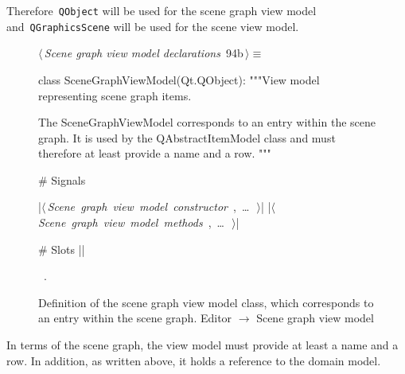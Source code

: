 \documentclass[%
    a4paper,    %
    justified,  %
    nobib,      %
    openany     %
]{tufte-book}
\makeatletter
\renewcommand{\label}[1]{\@tufte@label{##1}}%
\makeatother
\begin{document}
Therefore~\verb=QObject= will be used for the scene graph view model
and~\verb=QGraphicsScene= will be used for the scene view model.

\begin{figure}[!htbp]
\begin{flushleft} \small
\begin{minipage}{\linewidth}\label{scrap23}\raggedright\small
{} $\langle\,${\itshape Scene graph view model declarations}\nobreak\ {\footnotesize {94b}}$\,\rangle\equiv$
\vspace{-1ex}
\begin{pythoncode}
class SceneGraphViewModel(Qt.QObject):
    """View model representing scene graph items.

    The SceneGraphViewModel corresponds to an entry within the
    scene graph. It is used by the QAbstractItemModel class and
    must therefore at least provide a name and a row.
    """

    # Signals

    |\hbox{$\langle\,${\itshape Scene graph view model constructor}\nobreak\ {\footnotesize {}, \ldots\ }$\,\rangle$}|
    |\hbox{$\langle\,${\itshape Scene graph view model methods}\nobreak\ {\footnotesize {}, \ldots\ }$\,\rangle$}|

    # Slots
|\NWsep|
\end{pythoncode}
\vspace{1.5ex}
\footnotesize
\begin{list}{}{\setlength{\itemsep}{-\parsep}\setlength{\itemindent}{-\leftmargin}}
\item \NWtxtMacroRefIn\ .

\item{}
\end{list}
\end{minipage}\vspace{4ex}
\end{flushleft}
\caption{Definition of the scene graph view model class, which corresponds to an
  entry within the scene graph.
  \newline{}\newline{}Editor $\rightarrow$ Scene graph view model}
\end{figure}

In terms of the scene graph, the view model must provide at least a name and a
row. In addition, as written above, it holds a reference to the domain model.
\end{document}
